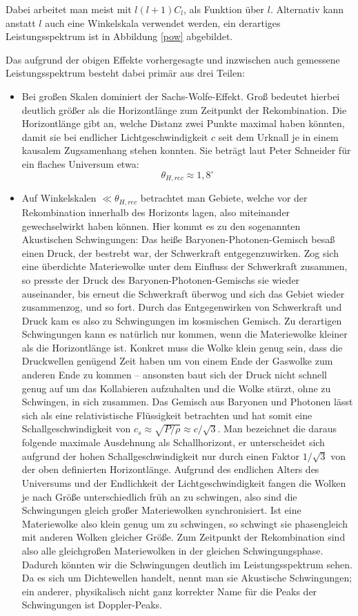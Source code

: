 \documentclass[10pt,a4paper]{article}
\begin{document}
Dabei arbeitet man meist mit $l\left(l+1\right)C_l$, als Funktion über $l$. Alternativ kann anstatt $l$ auch eine Winkelskala verwendet werden, ein derartiges Leistungsspektrum ist in Abbildung \ref{pow} abgebildet.

Das aufgrund der obigen Effekte vorhergesagte und inzwischen auch gemessene Leistungsspektrum besteht dabei primär aus drei Teilen:
\begin{itemize}
\item Bei großen Skalen dominiert der Sachs-Wolfe-Effekt.\cite{A+R} Groß bedeutet hierbei deutlich größer als die Horizontlänge zum Zeitpunkt der Rekombination. Die Horizontlänge gibt an, welche Distanz zwei Punkte maximal haben könnten, damit sie bei endlicher Lichtgeschwindigkeit $c$ seit dem Urknall je in einem kausalem Zugsamenhang stehen konnten. Sie beträgt laut Peter Schneider\cite{Schneider} für ein flaches Universum etwa:
\[ \theta_{H,rec} \approx 1,8^\circ \]
\item Auf Winkelskalen $\ll\theta_{H,rec}$ betrachtet man Gebiete, welche vor der Rekombination innerhalb des Horizonts lagen, also miteinander gewechselwirkt haben können. Hier kommt es zu den sogenannten Akustischen Schwingungen:
Das heiße Baryonen-Photonen-Gemisch besaß einen Druck, der bestrebt war, der Schwerkraft entgegenzuwirken. Zog sich eine überdichte Materiewolke unter dem Einfluss der Schwerkraft zusammen, so presste der Druck des Baryonen-Photonen-Gemischs sie wieder auseinander, bis erneut die Schwerkraft überwog und sich das Gebiet wieder zusammenzog, und so fort. Durch das Entgegenwirken von Schwerkraft und Druck kam es also zu Schwingungen im kosmischen Gemisch.
Zu derartigen Schwingungen kann es natürlich nur kommen, wenn die Materiewolke kleiner als die Horizontlänge ist. Konkret muss die Wolke klein genug sein, dass die Druckwellen genügend Zeit haben um von einem Ende der Gaswolke zum anderen Ende zu kommen -- ansonsten baut sich der Druck nicht schnell genug auf um das Kollabieren aufzuhalten und die Wolke stürzt, ohne zu Schwingen, in sich zusammen.\cite{S+W00} Das Gemisch aus Baryonen und Photonen lässt sich als eine relativistische Flüssigkeit betrachten und hat somit eine Schallgeschwindigkeit von $c_s\approx\sqrt{P/\rho}\approx c/\sqrt{3}$.\cite{Schneider} Man bezeichnet die daraus folgende maximale Ausdehnung als Schallhorizont, er unterscheidet sich aufgrund der hohen Schallgeschwindigkeit nur durch einen Faktor $1/\sqrt3$ von der oben definierten Horizontlänge.
Aufgrund des endlichen Alters des Universums und der Endlichkeit der Lichtgeschwindigkeit fangen die Wolken je nach Größe unterschiedlich früh an zu schwingen, also sind die Schwingungen gleich großer Materiewolken synchronisiert. Ist eine Materiewolke also klein genug um zu schwingen, so schwingt sie phasengleich mit anderen Wolken gleicher Größe. Zum Zeitpunkt der Rekombination sind also alle gleichgroßen Materiewolken in der gleichen Schwingungsphase.\cite{A+R} Dadurch könnten wir die Schwingungen deutlich im Leistungsspektrum sehen. Da es sich um Dichtewellen handelt, nennt man sie Akustische Schwingungen; ein anderer, physikalisch nicht ganz korrekter Name für die Peaks der Schwingungen ist Doppler-Peaks.\cite{S+W00}

\end{itemize}
\end{document}
